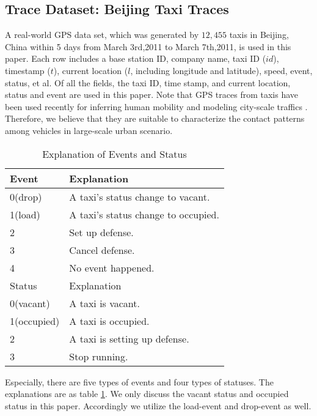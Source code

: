 \subsection{Trace Dataset: Beijing Taxi Traces}
\label{section_trace_data}

A real-world GPS data set, which was generated by $12,455$ taxis in Beijing, China within 5 days from March 3rd,2011 to March 7th,2011, is used in this paper.
Each row includes a base station ID, company name, taxi ID ($id$), timestamp ($t$), current location ($l$, including longitude and latitude), speed, event, status, et al. Of all the fields, the taxi ID, time stamp, and current location, status and event are used in this paper. Note that GPS traces from taxis have been used recently for inferring human mobility \cite{Ganti} and modeling city-scale traffics \cite{Aslam}. Therefore, we believe that they are suitable to characterize the contact patterns among vehicles in large-scale urban scenario.

\begin{table}[!h]
\caption{Explanation of Events and Status}\label{table_event_detail}
\centering
\begin{tabular}{l|l}
  \hline
  Event & Explanation \\
  \hline
  0(drop) & A taxi's status change to vacant.\\
  \hline
  1(load) & A taxi's status change to occupied.\\
  \hline
  2 & Set up defense.\\
  \hline
  3 & Cancel defense.\\
  \hline
  4 & No event happened.\\
  \hline
  \hline
  Status & Explanation \\
  \hline
0(vacant) & A taxi is vacant. \\
    \hline
1(occupied) & A taxi is occupied. \\
    \hline
2 & A taxi is setting up defense. \\
    \hline
3 & Stop running.\\
  \hline
\end{tabular}
\end{table}


Especially, there are five types of events and four types of statuses. The explanations are as table \ref{table_event_detail}. We only discuss the vacant status and occupied status in this paper. Accordingly we utilize the load-event and drop-event as well.






